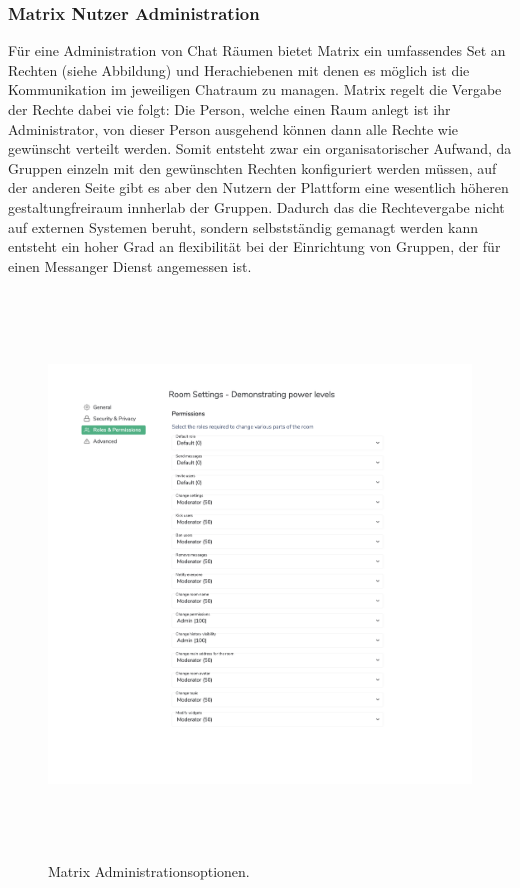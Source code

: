 \subsubsection{Matrix Nutzer Administration}\label{chapter:vdmf}
Für eine Administration von Chat Räumen bietet Matrix ein umfassendes Set an Rechten (siehe Abbildung) und Herachiebenen mit denen es möglich ist die Kommunikation im jeweiligen Chatraum zu managen. Matrix regelt die Vergabe der Rechte dabei vie folgt: Die Person, welche einen Raum anlegt ist ihr Administrator, von dieser Person ausgehend können dann alle Rechte wie gewünscht verteilt werden. Somit entsteht zwar ein organisatorischer Aufwand, da Gruppen einzeln mit den gewünschten Rechten konfiguriert werden müssen, auf der anderen Seite gibt es aber den Nutzern der Plattform eine wesentlich höheren gestaltungfreiraum innherlab der Gruppen. Dadurch das die Rechtevergabe nicht auf externen Systemen beruht, sondern selbstständig gemanagt werden kann entsteht ein hoher Grad an flexibilität bei der Einrichtung von Gruppen, der für einen Messanger Dienst angemessen ist.

\begin{figure}[htb]
    \centering
    \includegraphics[height=15cm]{graphics/moderation3.png}
    \caption[Matrix Administrationsoptionen]{Matrix Administrationsoptionen.\footnotemark}
    \label{abb:UI}
\end{figure}
